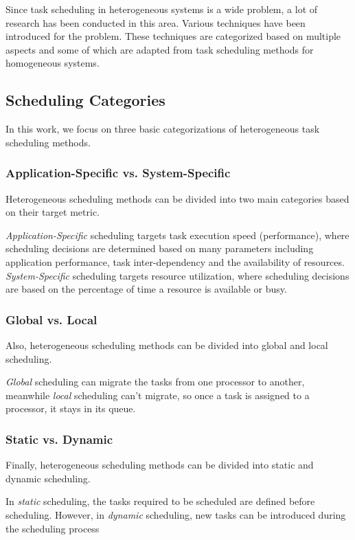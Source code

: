 Since task scheduling in heterogeneous systems is a wide problem, a lot of research has been conducted in this area. Various techniques have been introduced for the problem. These techniques are categorized based on multiple aspects \cite{inbook} and some of which are adapted from task scheduling methods for homogeneous systems.

\subsection{Scheduling Categories}
In this work, we focus on three basic categorizations of heterogeneous task scheduling methods. \\

\subsubsection{Application-Specific vs. System-Specific}
Heterogeneous scheduling methods can be divided into two main categories based on their target metric.

\emph{Application-Specific} scheduling targets task execution speed (performance), where scheduling
decisions are determined based on many parameters including application performance, task inter-dependency and the availability of resources. \emph{System-Specific} scheduling targets resource utilization, where scheduling decisions are based on the percentage of time a resource is available or busy. \\

\subsubsection{Global vs. Local}
Also, heterogeneous scheduling methods can be divided into global and local scheduling.

\emph{Global} scheduling can migrate the tasks from one processor to another, meanwhile \emph{local} scheduling can't migrate, so once a task is assigned to a processor, it stays in its queue.  \\

\subsubsection{Static vs. Dynamic}
Finally, heterogeneous scheduling methods can be divided into static and dynamic scheduling. 

In \emph{static} scheduling, the tasks required to be scheduled are defined before scheduling. However, in \emph{dynamic} scheduling, new tasks can be introduced during the scheduling process

